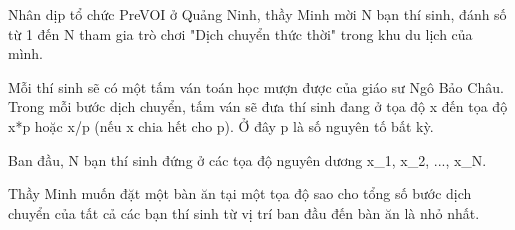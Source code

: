 Nhân dịp tổ chức PreVOI ở Quảng Ninh, thầy Minh mời N bạn thí sinh, đánh số từ 1 đến N tham gia trò chơi "Dịch chuyển thức thời" trong khu du lịch của mình.

Mỗi thí sinh sẽ có một tấm ván toán học mượn được của giáo sư Ngô Bảo Châu. Trong mỗi bước dịch chuyển, tấm ván sẽ đưa thí sinh đang ở tọa độ x đến tọa độ x*p hoặc x/p (nếu x chia hết cho p). Ở đây p là số nguyên tố bất kỳ.

Ban đầu, N bạn thí sinh đứng ở các tọa độ nguyên dương x\_1, x\_2, ..., x\_N.

Thầy Minh muốn đặt một bàn ăn tại một tọa độ sao cho tổng số bước dịch chuyển của tất cả các bạn thí sinh từ vị trí ban đầu đến bàn ăn là nhỏ nhất.

\